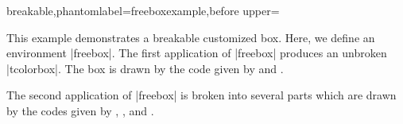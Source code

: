 \clearpage
\begin{dispListing*}{breakable,phantomlabel=freeboxexample,before upper={This example demonstrates
a breakable customized box. Here, we define an environment |freebox|.
The first application of |freebox| produces an unbroken |tcolorbox|.
The box is drawn by the code given by 
and .\par
The second application of |freebox| is broken into several parts which
are drawn by the codes given by
,
, and
.
\par\bigskip
}}


\end{dispListing*}
